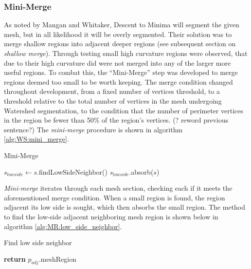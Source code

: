 \subsubsection{Mini-Merge}
As noted by Mangan and Whitaker, Descent to Minima will segment the given mesh, but in all likelihood it will be overly segmented.
Their solution was to merge shallow regions into adjacent deeper regions (see subsequent section on \textit{shallow merge}).
Through testing small high curvature regions were observed, that due to their high curvature did were not merged into any of the larger more useful regions.
To combat this, the ``Mini-Merge'' step was developed to merge regions deemed too small to be worth keeping.
The merge condition changed throughout development, from a fixed number of vertices threshold, to a threshold relative to the total number of vertices in the mesh undergoing Watershed segmentation, to the condition that the number of perimeter vertices in the region be fewer than 50\% of the region's vertices.
(? reword previous sentence?)
The \textit{mini-merge} procedure is shown in algorithm \ref{alg:WS:mini_merge}.

\begin{algorithm}[htb]
\caption{Mini-Merge}\label{alg:WS:mini_merge}
\begin{algorithmic}[1]
			\State $s_{lowside} \leftarrow s$.findLowSideNeighbor()
			\State $s_{lowside}$.absorb($s$)
		\EndIf
	\EndFor
\EndFunction
\end{algorithmic}
\end{algorithm}

\textit{Mini-merge} iterates through each mesh section, checking each if it meets the aforementioned merge condition.
When a small region is found, the region adjacent its low side is sought, which then absorbs the small region.
The method to find the low-side adjacent neighboring mesh region is shown below in algorithm \ref{alg:MR:low_side_neighbor}.

\begin{algorithm}[htb]
\caption{Find low side neighbor}\label{alg:MR:low_side_neighbor}
\begin{algorithmic}[1]
				\State \textbf{return} $p_{adj}$.meshRegion
			\EndIf
		\EndFor
	\EndFor
\EndFunction
\end{algorithmic}
\end{algorithm}


